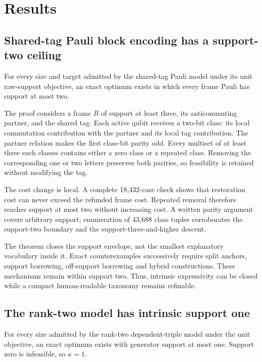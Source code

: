 \section{Results}

\subsection{Shared-tag Pauli block encoding has a support-two ceiling}

\begin{theorem}
For every size and target admitted by the shared-tag Pauli model under its unit raw-support objective, an exact optimum exists in which every frame Pauli has support at most two.
\end{theorem}

The proof considers a frame $R$ of support at least three, its anticommuting partner, and the shared tag.  Each active qubit receives a two-bit class: its local commutation contribution with the partner and its local tag contribution.  The partner relation makes the first class-bit parity odd.  Every multiset of at least three such classes contains either a zero class or a repeated class.  Removing the corresponding one or two letters preserves both parities, so feasibility is retained without modifying the tag.

The cost change is local.  A complete 18,432-case check shows that restoration cost can never exceed the refunded frame cost.  Repeated removal therefore reaches support at most two without increasing cost.  A written parity argument covers arbitrary support; enumeration of 43,688 class tuples corroborates the support-two boundary and the support-three-and-higher descent.

The theorem closes the support envelope, not the smallest explanatory vocabulary inside it.  Exact counterexamples successively require split anchors, support borrowing, off-support borrowing and hybrid constructions.  These mechanisms remain within support two.  Thus, intrinsic expressivity can be closed while a compact human-readable taxonomy remains refinable.

\subsection{The rank-two model has intrinsic support one}

\begin{theorem}
For every size admitted by the rank-two dependent-triple model under the unit objective, an exact optimum exists with generator support at most one.  Support zero is infeasible, so $\kappa=1$.
\end{theorem}

